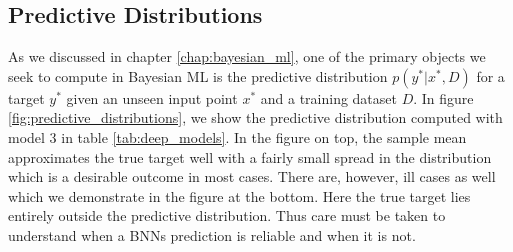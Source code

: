 \subsection{Predictive Distributions}
As we discussed in chapter \ref{chap:bayesian_ml}, one of the primary objects we seek to compute
in Bayesian ML is the predictive distribution $p(y^*|x^*, D)$ for a target $y^*$ given an unseen input point $x^*$ and
a training dataset $D$. In figure \ref{fig:predictive_distributions}, we show the predictive distribution computed with model 3 in table \ref{tab:deep_models}. In the figure on top, the sample mean approximates the true target well with a fairly small spread in the distribution which is a desirable outcome in most cases. There are, however, ill cases as well which we demonstrate in the figure at the bottom. Here the true target lies entirely outside the predictive distribution. Thus care must be taken to understand when a BNNs prediction is reliable and when it is not.
